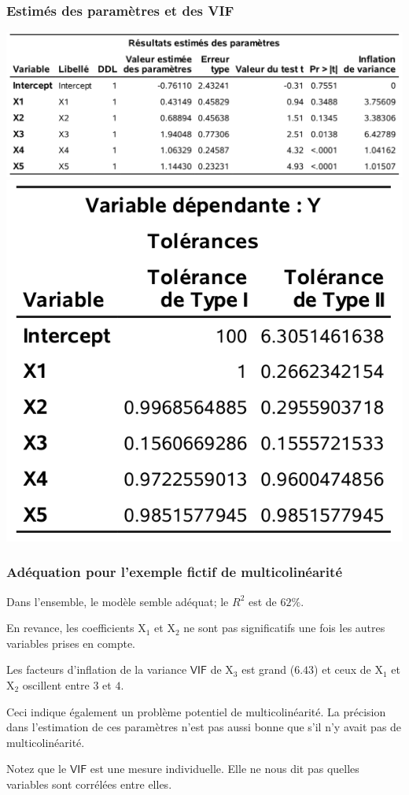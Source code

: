 \documentclass[xcolor={dvipsnames}]{beamer}
\begin{document}
 \begin{frame}
\frametitle{Estimés des paramètres et des VIF}
\begin{center}
\includegraphics[width= 0.8\linewidth]{img/c2/diapos3-e25}
\includegraphics[width= 0.4\linewidth]{img/c2/diapos3-e26}
\end{center}
\end{frame}

\begin{frame}[fragile]
\frametitle{Adéquation pour l'exemple fictif de multicolinéarité}
\bi
\item Dans l'ensemble, le modèle semble adéquat; le  $R^2$ est de $62\%$. 
\item En revance, les coefficients $\mathrm{X}_1$ et $\mathrm{X}_2$ ne sont pas significatifs une fois les autres variables prises en compte.
\item Les facteurs d'inflation de la variance $\mathsf{VIF}$ de $\mathrm{X}_3$ est grand ($6.43$) et ceux de $\mathrm{X}_1$ et $\mathrm{X}_2$ oscillent entre $3$ et $4$.
\item \alert{Ceci indique également un problème potentiel de multicolinéarité}. La précision
dans l'estimation de ces paramètres n'est pas aussi bonne que s'il n'y avait
pas de multicolinéarité.
\item Notez que le $\mathsf{VIF}$ est une mesure individuelle. Elle ne nous
dit pas quelles variables sont corrélées entre elles.
\ei
\end{frame}
\end{document}
